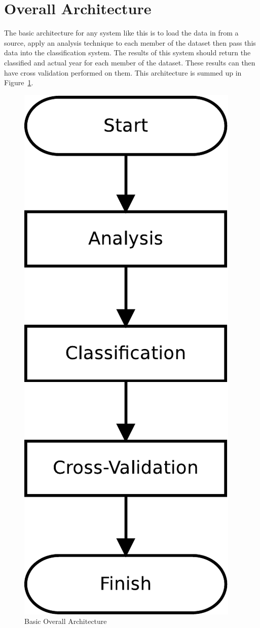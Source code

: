 \section{Overall Architecture}
The basic architecture for any system like this is to load the data in from a source,
apply an analysis technique to each member of the dataset then pass this data into the classification system. 
The results of this system should return the classified and actual year for each member of the dataset.
These results can then have cross validation performed on them. This architecture is summed up in
Figure~\ref{fig:basic-arch}.

\begin{figure}[h]
\centering
\includegraphics[scale=0.4]{img/basic-arch}
\caption{Basic Overall Architecture}\label{fig:basic-arch}
\end{figure}

